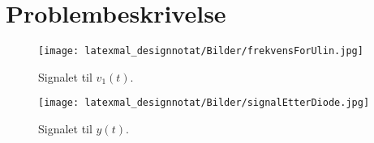 \section{Problembeskrivelse}
\label{problemBeskrivelse}



\begin{figure}[!h]
    \centering
    \begin{minipage}[c]{0.4\textwidth}
        \centering
        \texttt{[image: latexmal\_designnotat/Bilder/frekvensForUlin.jpg]} 
        \caption{Signalet til $v_1(t)$.}
        \label{fig:sinusFrekvens}
    \end{minipage}
    \hfill
    \begin{minipage}[c]{0.4\textwidth}
        \centering
        \texttt{[image: latexmal\_designnotat/Bilder/signalEtterDiode.jpg]} 
        \caption{Signalet til $y(t)$.}
        \label{fig:ulinFrekvens}
    \end{minipage}
\end{figure}